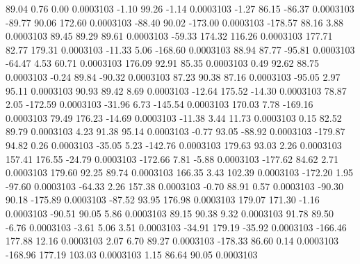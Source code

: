        89.04        0.76        0.00     0.0003103
       -1.10       99.26       -1.14     0.0003103
       -1.27       86.15      -86.37     0.0003103
      -89.77       90.06      172.60     0.0003103
      -88.40       90.02     -173.00     0.0003103
     -178.57       88.16        3.88     0.0003103
       89.45       89.29       89.61     0.0003103
      -59.33      174.32      116.26     0.0003103
      177.71       82.77      179.31     0.0003103
      -11.33        5.06     -168.60     0.0003103
       88.94       87.77      -95.81     0.0003103
      -64.47        4.53       60.71     0.0003103
      176.09       92.91       85.35     0.0003103
        0.49       92.62       88.75     0.0003103
       -0.24       89.84      -90.32     0.0003103
       87.23       90.38       87.16     0.0003103
      -95.05        2.97       95.11     0.0003103
       90.93       89.42        8.69     0.0003103
      -12.64      175.52      -14.30     0.0003103
       78.87        2.05     -172.59     0.0003103
      -31.96        6.73     -145.54     0.0003103
      170.03        7.78     -169.16     0.0003103
       79.49      176.23      -14.69     0.0003103
      -11.38        3.44       11.73     0.0003103
        0.15       82.52       89.79     0.0003103
        4.23       91.38       95.14     0.0003103
       -0.77       93.05      -88.92     0.0003103
     -179.87       94.82        0.26     0.0003103
      -35.05        5.23     -142.76     0.0003103
      179.63       93.03        2.26     0.0003103
      157.41      176.55      -24.79     0.0003103
     -172.66        7.81       -5.88     0.0003103
     -177.62       84.62        2.71     0.0003103
      179.60       92.25       89.74     0.0003103
      166.35        3.43      102.39     0.0003103
     -172.20        1.95      -97.60     0.0003103
      -64.33        2.26      157.38     0.0003103
       -0.70       88.91        0.57     0.0003103
      -90.30       90.18     -175.89     0.0003103
      -87.52       93.95      176.98     0.0003103
      179.07      171.30       -1.16     0.0003103
      -90.51       90.05        5.86     0.0003103
       89.15       90.38        9.32     0.0003103
       91.78       89.50       -6.76     0.0003103
       -3.61        5.06        3.51     0.0003103
      -34.91      179.19      -35.92     0.0003103
     -166.46      177.88       12.16     0.0003103
        2.07        6.70       89.27     0.0003103
     -178.33       86.60        0.14     0.0003103
     -168.96      177.19      103.03     0.0003103
        1.15       86.64       90.05     0.0003103
